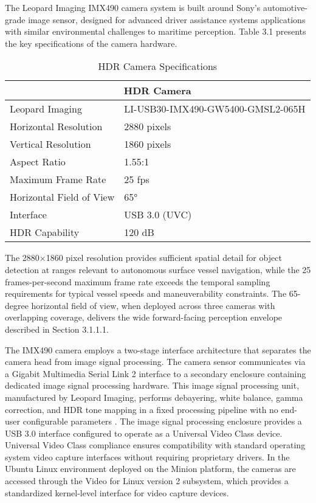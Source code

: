 \documentclass{erauthesis}
\begin{document}
The Leopard Imaging IMX490 camera system is built around Sony's automotive-grade image sensor, designed for advanced driver assistance systems applications with similar environmental challenges to maritime perception.
Table 3.1 presents the key specifications of the camera hardware.

\begin{table}[h]
\centering
\caption{HDR Camera Specifications}
\begin{tabular}{ll}
\hline
\multicolumn{2}{c}{HDR Camera}\\
\hline
\hline
Leopard Imaging & LI-USB30-IMX490-GW5400-GMSL2-065H \\
Horizontal Resolution & 2880 pixels \\
Vertical Resolution & 1860 pixels \\
Aspect Ratio & 1.55:1 \\
Maximum Frame Rate & 25 fps \\
Horizontal Field of View & 65° \\
Interface & USB 3.0 (UVC) \\
HDR Capability & 120 dB \\
\hline
\end{tabular}
\label{tab:hdr_camera_specs}
\end{table}

The 2880×1860 pixel resolution provides sufficient spatial detail for object detection at ranges relevant to autonomous surface vessel navigation, while the 25 frames-per-second maximum frame rate exceeds the temporal sampling requirements for typical vessel speeds and maneuverability constraints.
The 65-degree horizontal field of view, when deployed across three cameras with overlapping coverage, delivers the wide forward-facing perception envelope described in Section 3.1.1.1.

The IMX490 camera employs a two-stage interface architecture that separates the camera head from image signal processing.
The camera sensor communicates via a Gigabit Multimedia Serial Link 2 interface to a secondary enclosure containing dedicated image signal processing hardware.
This image signal processing unit, manufactured by Leopard Imaging, performs debayering, white balance, gamma correction, and \ac{HDR} tone mapping in a fixed processing pipeline with no end-user configurable parameters \cite{thompson2023}.
The image signal processing enclosure provides a USB 3.0 interface configured to operate as a Universal Video Class device.
Universal Video Class compliance ensures compatibility with standard operating system video capture interfaces without requiring proprietary drivers.
In the Ubuntu Linux environment deployed on the Minion platform, the cameras are accessed through the Video for Linux version 2 subsystem, which provides a standardized kernel-level interface for video capture devices.
\end{document}
